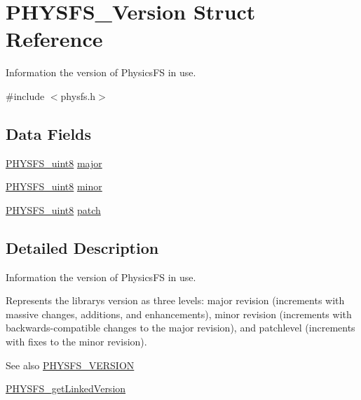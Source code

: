 \hypertarget{struct_p_h_y_s_f_s___version}{}\section{P\+H\+Y\+S\+F\+S\+\_\+\+Version Struct Reference}
\label{struct_p_h_y_s_f_s___version}


Information the version of Physics\+FS in use.  




{\ttfamily \#include $<$physfs.\+h$>$}

\subsection*{Data Fields}
\begin{DoxyCompactItemize}
\item 
\hyperlink{physfs_8h_abb348466106a912e03cf63f494a30356}{P\+H\+Y\+S\+F\+S\+\_\+uint8} \hyperlink{struct_p_h_y_s_f_s___version_ac60a805b6b7c342cb1718356f5be4dc2}{major}
\item 
\hyperlink{physfs_8h_abb348466106a912e03cf63f494a30356}{P\+H\+Y\+S\+F\+S\+\_\+uint8} \hyperlink{struct_p_h_y_s_f_s___version_a753a884de5c4ef33bff3dfb2e0bb1a0c}{minor}
\item 
\hyperlink{physfs_8h_abb348466106a912e03cf63f494a30356}{P\+H\+Y\+S\+F\+S\+\_\+uint8} \hyperlink{struct_p_h_y_s_f_s___version_a565624d6f0785e5cb4c706583c682e20}{patch}
\end{DoxyCompactItemize}


\subsection{Detailed Description}
Information the version of Physics\+FS in use. 

Represents the library\textquotesingle{}s version as three levels\+: major revision (increments with massive changes, additions, and enhancements), minor revision (increments with backwards-\/compatible changes to the major revision), and patchlevel (increments with fixes to the minor revision).

\begin{DoxySeeAlso}{See also}
\hyperlink{physfs_8h_acb77c1f8f70028add43b9f81eef1ed78}{P\+H\+Y\+S\+F\+S\+\_\+\+V\+E\+R\+S\+I\+ON} 

\hyperlink{physfs_8h_a8977d0ba0a2301256e823532479f1a05}{P\+H\+Y\+S\+F\+S\+\_\+get\+Linked\+Version} 
\end{DoxySeeAlso}


